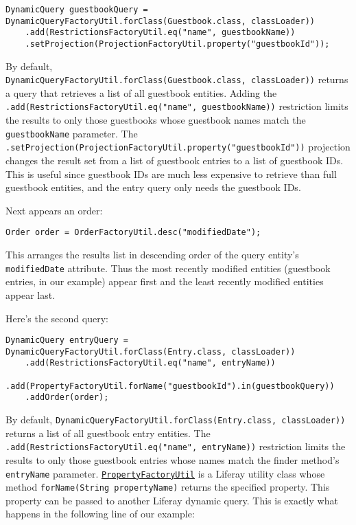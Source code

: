 \begin{verbatim}
DynamicQuery guestbookQuery = DynamicQueryFactoryUtil.forClass(Guestbook.class, classLoader))
    .add(RestrictionsFactoryUtil.eq("name", guestbookName))
    .setProjection(ProjectionFactoryUtil.property("guestbookId"));
\end{verbatim}

By default,
\texttt{DynamicQueryFactoryUtil.forClass(Guestbook.class,\ classLoader))}
returns a query that retrieves a list of all guestbook entities. Adding
the \texttt{.add(RestrictionsFactoryUtil.eq("name",\ guestbookName))}
restriction limits the results to only those guestbooks whose guestbook
names match the \texttt{guestbookName} parameter. The
\texttt{.setProjection(ProjectionFactoryUtil.property("guestbookId"))}
projection changes the result set from a list of guestbook entries to a
list of guestbook IDs. This is useful since guestbook IDs are much less
expensive to retrieve than full guestbook entities, and the entry query
only needs the guestbook IDs.

Next appears an order:

\begin{verbatim}
Order order = OrderFactoryUtil.desc("modifiedDate");
\end{verbatim}

This arranges the results list in descending order of the query entity's
\texttt{modifiedDate} attribute. Thus the most recently modified
entities (guestbook entries, in our example) appear first and the least
recently modified entities appear last.

Here's the second query:

\begin{verbatim}
DynamicQuery entryQuery = DynamicQueryFactoryUtil.forClass(Entry.class, classLoader))
    .add(RestrictionsFactoryUtil.eq("name", entryName))
    .add(PropertyFactoryUtil.forName("guestbookId").in(guestbookQuery))
    .addOrder(order);
\end{verbatim}

By default,
\texttt{DynamicQueryFactoryUtil.forClass(Entry.class,\ classLoader))}
returns a list of all guestbook entry entities. The
\texttt{.add(RestrictionsFactoryUtil.eq("name",\ entryName))}
restriction limits the results to only those guestbook entries whose
names match the finder method's \texttt{entryName} parameter.
\href{https://docs.liferay.com/dxp/portal/7.0-latest/javadocs/portal-kernel/com/liferay/portal/kernel/dao/orm/PropertyFactoryUtil.html}{\texttt{PropertyFactoryUtil}}
is a Liferay utility class whose method
\texttt{forName(String\ propertyName)} returns the specified property.
This property can be passed to another Liferay dynamic query. This is
exactly what happens in the following line of our example:

